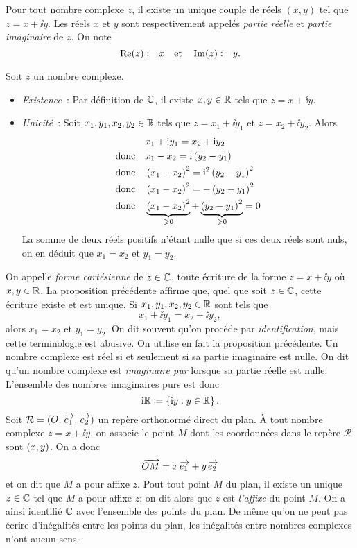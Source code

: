 \documentclass{magnolia}
\begin{document}
\begin{definition}[utile=-3]
  Pour tout nombre complexe $z$, il existe un unique couple de réels $(x,y)$ 
  tel que $z=x+\ii y$. Les réels $x$ et $y$ sont respectivement appelés \emph{partie réelle} et \emph{partie imaginaire} de $z$. On note
  $$\mathop{\rm Re}(z)\coloneqq x \quad \text{et} \quad \mathop{\rm Im}(z)\coloneqq y.$$
\end{definition}
\begin{preuve}
  Soit $z$ un nombre complexe.
  \begin{itemize}
  \item \emph{Existence}~:
    Par définition de $\mathbb{C}$, il existe $x,y\in\mathbb{R}$ tels que $z=x+\ii y$.
  \item \emph{Unicité}~:
    Soit $x_1,y_1,x_2,y_2\in\mathbb{R}$ tels que $z=x_1+\ii y_1$ et $z=x_2+\ii y_2$. Alors
    \begin{equation*}\begin{split}
    & x_1+{\rm i} y_1=x_2+{\rm i} y_2\\
    \text{donc}\quad  & x_1-x_2={\rm i}\left(y_2-y_1\right)\\
    \text{donc}\quad  & \left(x_1-x_2\right)^2={\rm i}^2\left(y_2-y_1\right)^2\\   
    \text{donc}\quad  & \left(x_1-x_2\right)^2=-\left(y_2-y_1\right)^2\\   
    \text{donc}\quad  & \underbrace{\left(x_1-x_2\right)^2}_{\geqslant 0}+
                        \underbrace{\left(y_2-y_1\right)^2}_{\geqslant 0}=0
    \end{split}\end{equation*}
    La somme de deux réels positifs n'étant nulle que si ces deux réels sont
    nuls, on en déduit que $x_1=x_2$ et $y_1=y_2$.
  \end{itemize}
\end{preuve}

\begin{remarques}
\remarque On appelle \emph{forme cartésienne} de $z\in\mathbb{C}$, toute écriture de la forme $z=x+\ii y$ où $x,y\in\mathbb{R}$. La proposition précédente affirme que, quel que soit $z\in\mathbb{C}$, cette écriture existe et est unique.
\remarque Si $x_1,y_1,x_2,y_2\in\mathbb{R}$ sont tels que
  \[x_1+\ii y_1=x_2+\ii y_2,\]
  alors $x_1=x_2$ et $y_1=y_2$. On dit souvent qu'on procède par \emph{identification}, mais cette terminologie est abusive. On utilise en fait la proposition précédente.
\remarque Un nombre complexe est réel si et seulement si sa partie imaginaire est nulle. On dit qu'un nombre complexe
  est \emph{imaginaire pur} lorsque sa partie réelle est nulle. L'ensemble des nombres imaginaires purs est
  donc
  \[{\rm i}\mathbb{R}\coloneqq\left\{{\rm i} y : y\in\mathbb{R}\right\}.\]
\remarque Soit $\mathcal{R}=\left(O,\kern 2pt\overrightarrow{\kern -2pte_1},\kern 2pt\overrightarrow{\kern -2pte_2}\right)$ un repère orthonormé
  direct du plan. À tout nombre complexe $z=x+\ii y$, on associe le point $M$ dont les coordonnées dans le repère
  $\mathcal{R}$ sont $\left(x,y\right)$. On a donc
  \[\kern 2pt\overrightarrow{\kern -2ptOM}=x\kern 2pt\overrightarrow{\kern -2pte_1}+y\kern 2pt\overrightarrow{\kern -2pte_2}\]
  et on dit que $M$ a pour affixe $z$. Pout tout point $M$ du plan, il existe un unique $z\in\mathbb{C}$ tel que
  $M$ a pour affixe $z$; on dit alors que $z$ est \emph{l'affixe} du point $M$. On a ainsi identifié
  $\mathbb{C}$ avec l'ensemble des points du plan.
\remarque De même qu'on ne peut pas écrire d'inégalités entre les points du plan, les inégalités entre nombres
  complexes n'ont aucun sens.
\end{remarques}
\end{document}
